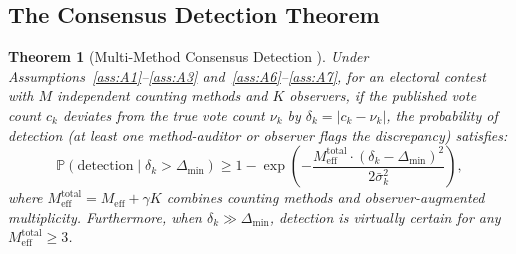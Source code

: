\documentclass[11pt,a4paper]{article}
\newtheorem{theorem}{Theorem}[section]
\theoremstyle{definition}
\newcommand{\Pbb}{\mathbb{P}}
\begin{document}
\subsection{The Consensus Detection Theorem}
\begin{theorem}[Multi-Method Consensus Detection ]
\label{thm:consensus_detection}
Under Assumptions~\ref{ass:A1}--\ref{ass:A3} and~\ref{ass:A6}--\ref{ass:A7}, for an electoral contest with $M$ independent counting methods and $K$ observers, if the published vote count $c_k$ deviates from the true vote count $\nu_k$ by $\delta_k = |c_k - \nu_k|$, the probability of detection (at least one method-auditor or observer flags the discrepancy) satisfies:
\begin{equation}
    \Pbb(\text{detection} \mid \delta_k > \Delta_{\min}) \geq 1 - \exp\left(-\frac{M_{\text{eff}}^{\text{total}} \cdot (\delta_k - \Delta_{\min})^2}{2\bar{\sigma}_k^2}\right),
    \label{eq:detection_theorem}
\end{equation}
where $M_{\text{eff}}^{\text{total}} = M_{\text{eff}} + \gamma K$ combines counting methods and observer-augmented multiplicity. Furthermore, when $\delta_k \gg \Delta_{\min}$, detection is virtually certain for any $M_{\text{eff}}^{\text{total}} \geq 3$.
\end{theorem}
\end{document}
